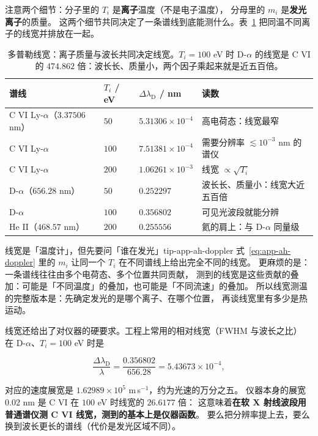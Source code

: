 注意两个细节：分子里的 $T_i$ 是\textbf{离子}温度（不是电子温度），
分母里的 $m_i$ 是\textbf{发光离子}的质量。
这两个细节共同决定了一条谱线到底能测什么。表~\ref{tab:app-ah-doppler} 把同温不同离子的线宽并排放在一起。

\begin{table}[htbp]
\centering
\small
\caption{多普勒线宽：离子质量与波长共同决定线宽。$T_i=100$ eV 时
D-$\alpha$ 的线宽是 C VI 的 $474.862$ 倍：波长长、质量小，两个因子乘起来就是近五百倍。}
\label{tab:app-ah-doppler}
\begin{tabular}{p{2.6cm}p{2.0cm}p{2.6cm}p{4.9cm}}
\toprule
谱线 & $T_i$ / eV & $\Delta\lambda_{\mathrm{D}}$ / nm & 读数 \\
\midrule
C VI Ly-$\alpha$（$3.37506$ nm） & $50$ & $5.31306\times10^{-4}$ & 高电荷态：线宽最窄 \\
C VI Ly-$\alpha$ & $100$ & $7.51381\times10^{-4}$ & 需要分辨率 $\lesssim10^{-3}$ nm 的谱仪 \\
C VI Ly-$\alpha$ & $200$ & $1.06261\times10^{-3}$ & 线宽 $\propto\sqrt{T_i}$ \\
D-$\alpha$（$656.28$ nm） & $50$ & $0.252297$ & 波长长、质量小：线宽大近五百倍 \\
D-$\alpha$ & $100$ & $0.356802$ & 可见光波段就能分辨 \\
He II（$468.57$ nm） & $200$ & $0.255556$ & 氦的肩上：与 D-$\alpha$ 同量级 \\
\bottomrule
\end{tabular}

\end{table}

\begin{tip}{线宽是「温度计」，但先要问「谁在发光」}{tip-app-ah-doppler}
式~\eqref{eq:app-ah-doppler} 里的 $m_i$ 让同一个 $T_i$ 在不同谱线上给出完全不同的线宽。
更麻烦的是：一条谱线往往由多个电荷态、多个位置共同贡献，
测到的线宽是这些贡献的叠加：可能是「不同温度」的叠加，也可能是「不同流速」的叠加。
所以线宽测温的完整版本是：先确定发光的是哪个离子、在哪个位置，
再谈线宽里有多少是热运动。
\end{tip}

线宽还给出了对仪器的硬要求。工程上常用的相对线宽（FWHM 与波长之比）
在 D-$\alpha$、$T_i=100$ eV 时是

\begin{equation}
\frac{\Delta\lambda_{\mathrm{D}}}{\lambda}
  = \frac{0.356802}{656.28} = 5.43673\times10^{-4},
\label{eq:app-ah-dopwidth}
\end{equation}

对应的速度展宽是 $1.62989\times10^{5}$ m\,s$^{-1}$，约为光速的万分之五。
仪器本身的展宽 $0.02$ nm 是 C VI 在 $100$ eV 时线宽的 $26.6177$ 倍：
这意味着\textbf{在软 X 射线波段用普通谱仪测 C VI 线宽，测到的基本上是仪器函数}。
要么把分辨率提上去，要么换到波长更长的谱线（代价是发光区域不同）。

